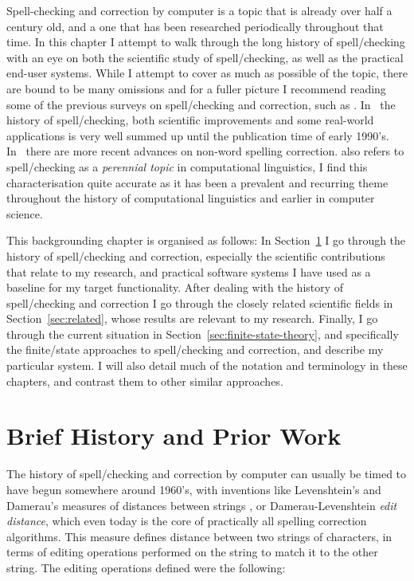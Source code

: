 \documentclass[officiallayout]{unihelcompling}
\begin{document}
Spell-checking and correction by computer is a topic that is already over half
a century old, and a one that has been researched periodically throughout that
time.  In this chapter I attempt to walk through the long history of
spell\-/checking with an eye on both the scientific study of spell\-/checking,
as well as the practical end-user systems. While I attempt to cover as
much as possible of the topic, there are bound to be many omissions and for
a fuller picture I recommend reading some of the previous surveys on
spell\-/checking and correction, such as
\citet{kukich1992spelling,mitton2009ordering}.  In~\citet{kukich1992spelling}
the history of spell\-/checking, both scientific improvements and some
real-world applications is very well summed up until the publication time of
early 1990's.  In~\citet{mitton2009ordering} there are more recent advances on
non-word spelling correction.  \citet{kukich1992spelling} also refers to
spell\-/checking as a \emph{perennial topic} in computational linguistics, I
find this characterisation quite accurate as it has been a prevalent and
recurring theme throughout the history of computational linguistics and earlier
in computer science.


This backgrounding chapter is organised as follows: In
Section~\ref{sec:history} I go through the history of spell\-/checking and
correction, especially the scientific contributions that relate to my research,
and practical software systems I have used as a baseline for my target
functionality.  After dealing with the history of spell\-/checking and
correction I go through the closely related scientific fields in
Section~\ref{sec:related}, whose results are relevant to my research. Finally,
I go through the current situation in Section~\ref{sec:finite-state-theory},
and specifically the finite\-/state approaches to spell\-/checking and
correction, and describe my particular system. I will also detail much of the
notation and terminology in these chapters, and contrast them to other similar
approaches.

\section{Brief History and Prior Work}
\label{sec:history}

The history of spell\-/checking and correction by computer can usually be timed
to have begun somewhere around 1960's, with inventions like Levenshtein's and
Damerau's measures of distances between strings
\citep{levenshtein1966binary,damerau1964technique}, or Damerau-Levenshtein
\emph{edit distance}, which even today is the core of practically all spelling
correction algorithms. This measure defines distance between two strings of
characters, in terms of editing operations performed on the string to match it
to the other string. The editing operations defined were the following:
\end{document}
